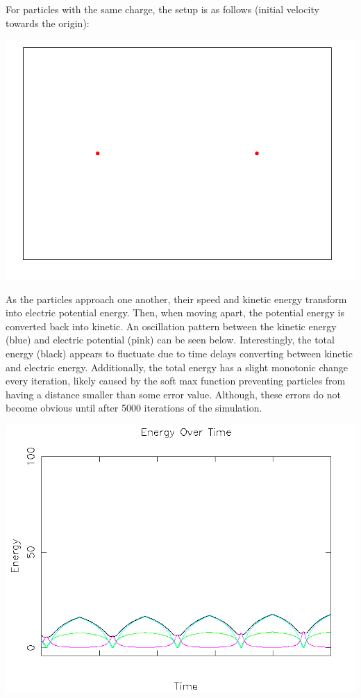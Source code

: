 \documentclass{article}
\begin{document}
For particles with the same charge, the setup is as follows (initial velocity towards the origin):
\\
\begin{center}
    \includegraphics[scale=0.5]{charged_2_same}
\end{center}

As the particles approach one another, their speed and kinetic energy transform into electric potential energy.
Then, when moving apart, the potential energy is converted back into kinetic.
An oscillation pattern between the kinetic energy (blue) and electric potential (pink) can be seen below.
Interestingly, the total energy (black) appears to fluctuate due to time delays
converting between kinetic and electric energy.
Additionally, the total energy has a slight monotonic change every iteration,
likely caused by the soft max function preventing particles from having
a distance smaller than some error value.
Although, these errors do not become obvious until after 5000 iterations of the simulation.
\\
\begin{center}
    \includegraphics[scale=0.5]{charged_2_same_energy}
\end{center}
\end{document}
